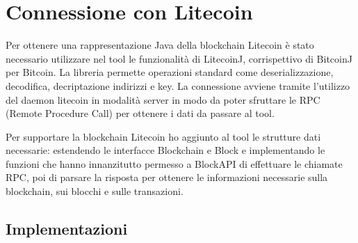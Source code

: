 \section{Connessione con Litecoin}
Per ottenere una rappresentazione Java della blockchain Litecoin è stato necessario utilizzare nel tool le funzionalità di LitecoinJ, corrispettivo di BitcoinJ per Bitcoin. La libreria permette operazioni standard come deserializzazione, decodifica, decriptazione indirizzi e key.
La connessione avviene tramite l’utilizzo del daemon litecoin in modalità server in modo da poter sfruttare le RPC (Remote Procedure Call) per ottenere i dati da passare al tool.

Per supportare la blockchain Litecoin ho aggiunto al tool le strutture dati necessarie: estendendo le interfacce Blockchain e Block e implementando le funzioni che hanno innanzitutto permesso a BlockAPI di effettuare le chiamate RPC, poi di parsare la risposta per ottenere le informazioni necessarie sulla blockchain, sui blocchi e sulle transazioni.

\subsection{Implementazioni}



